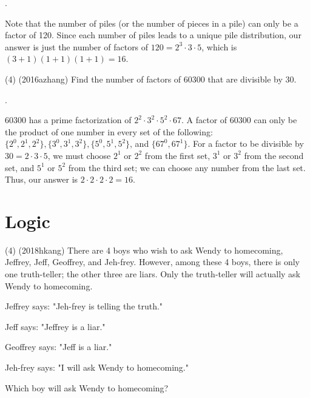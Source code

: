 \documentclass{article}
\begin{document}
\begin{answer}
.
\end{answer}

\begin{solution}
Note that the number of piles (or the number of pieces in a pile) can only be a factor of 120. Since each number of piles leads to a unique pile distribution, our answer is just the number of factors of $120 = 2^{3}\cdot3\cdot5$, which is $(3+1)(1+1)(1+1) = 16$.
\end{solution}

\begin{problem}
(4) (2016azhang) Find the number of factors of 60300 that are divisible by 30.
\end{problem}

\begin{answer}
.
\end{answer}

\begin{solution}
60300 has a prime factorization of $2^2\cdot3^2\cdot5^2\cdot67$. A factor of 60300 can only be the product of one number in every set of the following: $\{2^0, 2^1, 2^2\}, \{3^0, 3^1, 3^2\}, \{5^0, 5^1, 5^2\}$, and $\{67^0, 67^1\}$. For a factor to be divisible by $30 = 2\cdot3\cdot5$, we must choose $2^1$ or $2^2$ from the first set, $3^1$ or $3^2$ from the second set, and $5^1$ or $5^2$ from the third set; we can choose any number from the last set. Thus, our answer is $2\cdot2\cdot2\cdot2 = 16$.
\end{solution}

\section{Logic}
\begin{problem}
(4) (2018hkang) There are 4 boys who wish to ask Wendy to homecoming, Jeffrey, Jeff, Geoffrey, and Jeh-frey. However, among these 4 boys, there is only one truth-teller; the other three are liars. Only the truth-teller will actually ask Wendy to homecoming. 

Jeffrey says: "Jeh-frey is telling the truth."

Jeff says: "Jeffrey is a liar."

Geoffrey says: "Jeff is a liar."

Jeh-frey says: "I will ask Wendy to homecoming."

Which boy will ask Wendy to homecoming?
\end{problem}
\end{document}
